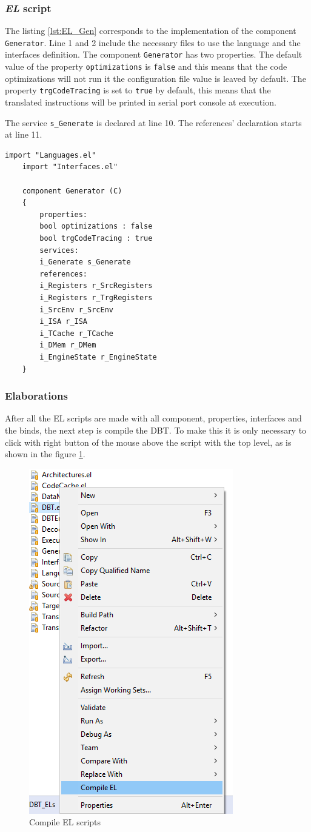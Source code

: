 \subsubsection{\textit{EL} script}

\par The listing \ref{lst:EL_Gen} corresponds to the implementation of the component \texttt{Generator}. Line 1 and 2 include the necessary files to use the language and the interfaces definition. The component \texttt{Generator} has two properties. The default value of the property \texttt{optimizations} is \texttt{false} and this means that the code optimizations will not run it the configuration file value is leaved by default. The property \texttt{trgCodeTracing} is set to \texttt{true} by default, this means that the translated instructions will be printed in serial port console at execution.
\par The service \texttt{s\_Generate} is declared at line 10. The references' declaration starts at line 11.

\begin{lstlisting}[language=EL, caption=Generator (EL representation)., label=lst:EL_Gen]
	import "Languages.el"
	import "Interfaces.el"
	
	component Generator (C)
	{
		properties:
		bool optimizations : false
		bool trgCodeTracing : true
		services:
		i_Generate s_Generate	
		references:
		i_Registers r_SrcRegisters
		i_Registers r_TrgRegisters
		i_SrcEnv r_SrcEnv
		i_ISA r_ISA
		i_TCache r_TCache
		i_DMem r_DMem				
		i_EngineState r_EngineState
	}
\end{lstlisting}

\subsubsection{Elaborations}

After all the EL scripts are made with all component, properties, interfaces and the binds, the next step is compile the DBT. To make this it is only necessary to click with right button of the mouse above the script with the top level, as is shown in the figure \ref{fig:compileel}.

\begin{figure} [H]
	\centering
	\includegraphics[width=0.4\linewidth]{Images/compileEL}
	\caption{Compile EL scripts}
	\label{fig:compileel}
\end{figure}

